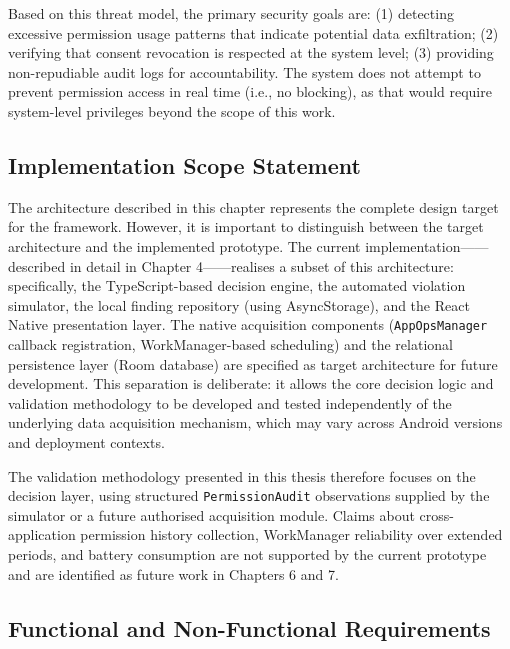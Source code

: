 Based on this threat model, the primary security goals are: (1) detecting excessive permission usage patterns that indicate potential data exfiltration; (2) verifying that consent revocation is respected at the system level; (3) providing non-repudiable audit logs for accountability. The system does not attempt to prevent permission access in real time (i.e., no blocking), as that would require system-level privileges beyond the scope of this work.

\subsection{Implementation Scope Statement}

The architecture described in this chapter represents the complete design target for the framework. However, it is important to distinguish between the target architecture and the implemented prototype. The current implementation——described in detail in Chapter 4——realises a subset of this architecture: specifically, the TypeScript-based decision engine, the automated violation simulator, the local finding repository (using AsyncStorage), and the React Native presentation layer. The native acquisition components (\texttt{AppOpsManager} callback registration, WorkManager-based scheduling) and the relational persistence layer (Room database) are specified as target architecture for future development. This separation is deliberate: it allows the core decision logic and validation methodology to be developed and tested independently of the underlying data acquisition mechanism, which may vary across Android versions and deployment contexts.

The validation methodology presented in this thesis therefore focuses on the decision layer, using structured \texttt{PermissionAudit} observations supplied by the simulator or a future authorised acquisition module. Claims about cross-application permission history collection, WorkManager reliability over extended periods, and battery consumption are not supported by the current prototype and are identified as future work in Chapters 6 and 7.

\subsection{Functional and Non-Functional Requirements}

